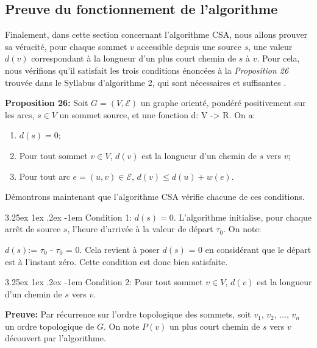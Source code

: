 \documentclass[12pt]{article}
\makeatletter
\renewcommand\paragraph{\@startsection{paragraph}{5}{\z@}%
  {3.25ex \@plus1ex \@minus.2ex}%
  {-1em}%
  {\normalfont\normalsize\bfseries}}
\makeatother
\begin{document}
\subsection{Preuve du fonctionnement de l'algorithme}

Finalement, dans cette section concernant l'algorithme CSA, nous allons prouver sa véracité, pour chaque sommet $v$ accessible depuis une source $s$, une 
valeur $d(v)$ correspondant à la longueur d'un plus court chemin de $s$ à $v$. Pour cela, nous vérifions qu'il satisfait les trois conditions énoncées 
à la \emph{Proposition 26} trouvée dans le Syllabus d'algorithme 2, qui sont nécessaires et suffisantes \cite{syllabusAlgo2}.

\textbf{Proposition 26:} Soit $G = (V, \mathcal{E})$ un graphe orienté, pondéré positivement sur les arcs, $s \in V$ un sommet source, et une fonction 
d: V -> R.
On a:
\begin{enumerate}
    \item $d(s) = 0$;
    \item Pour tout sommet $v \in V$, $d(v)$ est la longueur d'un chemin de $s$ vers $v$;
    \item Pour tout arc $e = (u, v) \in \mathcal{E}$, $d(v) \leq d(u) + w(e)$.
\end{enumerate}

\noindent Démontrons maintenant que l'algorithme CSA vérifie chacune de ces conditions.

\paragraph{Condition 1:}
 $d(s) = 0$.
L'algorithme initialise, pour chaque arrêt de source $s$, l'heure d'arrivée à la valeur de départ $\tau_0$. On note:

$d(s)$:= $\tau_0$ - $\tau_0$ = 0.
Cela revient à poser $d(s)$ = 0 en considérant que le départ est à l'instant zéro. Cette condition est donc bien satisfaite.

\paragraph{Condition 2:} 
Pour tout sommet $v \in V$, $d(v)$ est la longueur d'un chemin de $s$ vers $v$.

\medskip

\textbf{Preuve:}
Par récurrence sur l'ordre topologique des sommets,
soit $v_1$, $v_2$, $\dots$, $v_n$ un ordre topologique de $G$. On note $P(v)$ un plus court chemin de $s$ vers $v$ découvert par l'algorithme.
\end{document}
